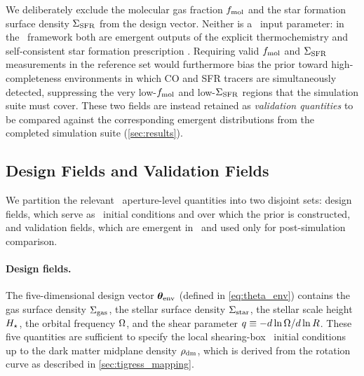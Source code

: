 We deliberately exclude the molecular gas fraction $f_{\rm mol}$ and the star
formation surface density $\Sigma_{\rm SFR}$ from the design vector. Neither is a
\TIGRESS\ input parameter: in the \TIGRESS\ framework both are emergent
outputs of the explicit thermochemistry and self-consistent star formation
prescription \citep{2024ApJ...972...67K}. Requiring valid
$f_{\rm mol}$ and $\Sigma_{\rm SFR}$ measurements in the reference set would furthermore bias
the prior toward high-completeness environments in which CO and SFR tracers
are simultaneously detected, suppressing the very low-$f_{\rm mol}$ and
low-$\Sigma_{\rm SFR}$ regions that the simulation suite must cover. These two fields
are instead retained as \emph{validation quantities} to be compared against
the corresponding emergent distributions from the completed simulation
suite (\autoref{sec:results}).

\subsection{Design Fields and Validation Fields}
\label{sec:sampling:fields}

We partition the relevant \PHANGS\ aperture-level quantities into two
disjoint sets: design fields, which serve as \TIGRESS\ initial conditions
and over which the prior is constructed, and validation fields, which are
emergent in \TIGRESS\ and used only for post-simulation comparison.

\paragraph{Design fields.}
The five-dimensional design vector $\boldsymbol{\theta}_{\rm env}$ (defined in
\autoref{eq:theta_env}) contains the gas surface density $\Sigma_{\rm gas}$, the
stellar surface density $\Sigma_{\rm star}$, the stellar scale height $H_\star$,
the orbital frequency $\Omega$, and the shear parameter
$q \equiv -d\ln\Omega/d\ln R$.
These five quantities are sufficient to specify the local shearing-box
\TIGRESS\ initial conditions up to the dark matter midplane density
$\rho_{\rm dm}$, which is derived from the rotation curve as described in
\autoref{sec:tigress_mapping}.

